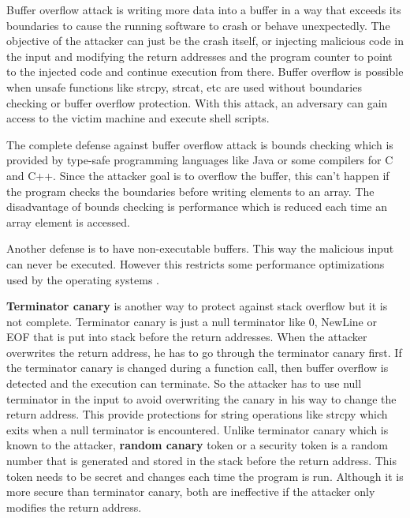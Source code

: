 \documentclass[12pt,a4paper]{article}
\begin{document}
\begin{enumerate}
\color{blue}
Buffer overflow attack is writing more data into a buffer in a way that exceeds its boundaries to cause the running software to crash or behave unexpectedly. The objective of the attacker can just be the crash itself, or injecting malicious code in the input and modifying the return addresses and the program counter to point to the injected code and continue execution from there. Buffer overflow is possible when unsafe functions like strcpy, strcat, etc are used without boundaries checking or buffer overflow protection. With this attack, an adversary can gain access to the victim machine and execute shell scripts. 


The complete defense against buffer overflow attack  is bounds checking which is provided by type-safe programming languages like Java or some compilers for C and C++. Since the attacker goal is to overflow the buffer, this can't happen if the program checks the boundaries before writing elements to an array. The disadvantage of bounds checking is performance which is reduced each time an array element is accessed.


Another defense is to have non-executable buffers. This way the malicious input can never be executed. However this restricts some performance optimizations used by the operating systems \cite{paper}.

\textbf{Terminator canary }is another way to protect against stack overflow but it is not complete. Terminator canary is just a null terminator like 0, NewLine or EOF that is put into stack before the return addresses. When the attacker overwrites the return address, he has to go through the terminator canary first. If the terminator canary is changed during a function call, then buffer overflow is detected and the execution can terminate. So the attacker has to use null terminator in the input to avoid overwriting the canary in his way to change the return address. This provide protections for string operations like strcpy which exits when a null terminator is encountered. Unlike terminator canary which is known to the attacker, \textbf{random canary} token or a security token is a random number that is generated and stored in the stack before the return address. This token needs to be secret and changes each time the program is run. Although it is more secure than terminator canary, both are ineffective if the attacker only modifies the return address. 


\end{enumerate}
\end{document}
